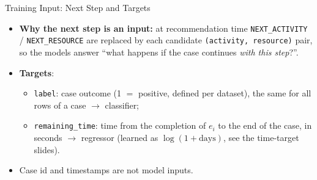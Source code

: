 \documentclass[aspectratio=169]{beamer} %
\begin{document}
\begin{frame}{Training Input: Next Step and Targets}
  \begin{itemize}
    \item \textbf{Why the next step is an input:} at recommendation time
      \texttt{NEXT\_ACTIVITY} / \texttt{NEXT\_RESOURCE} are replaced by each candidate
      \texttt{(activity, resource)} pair, so the models answer
      ``what happens if the case continues \emph{with this step}?''.
    \item \textbf{Targets}:
      \begin{itemize}
        \item \texttt{label}: case outcome (1 $=$ positive, defined per dataset),
          the same for all rows of a case $\rightarrow$ classifier;
        \item \texttt{remaining\_time}: time from the completion of $e_i$ to the end of the case, in
          seconds $\rightarrow$ regressor (learned as $\log(1+\text{days})$, see the time-target slides).
      \end{itemize}
    \item Case id and timestamps are not model inputs.
  \end{itemize}
\end{frame}
\end{document}
